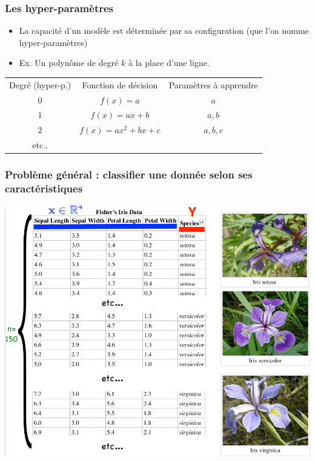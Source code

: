 \documentclass[french]{beamer}
\begin{document}
\begin{frame}
\frametitle{Les hyper-paramètres}

\begin{itemize}
\item La capacité d'un modèle est déterminée par sa configuration (que l'on nomme hyper-paramètres)

\item Ex. Un polynôme de degré $k$ à la place d'une ligne.
\end{itemize}

\begin{tabular}{ccc}
Degré (hyper-p.) & Fonction de décision & Paramètres à apprendre \\
$0$	& $f(x) = a$ & $a$ \\
$1$ & $f(x) = ax+b$ & $a,b$ \\
$2$ & $f(x) = ax^2 + bx + c$ & $a,b,c$ \\
etc..& &
\end{tabular}

\end{frame}



\begin{frame}[fragile]
\frametitle{Problème général : classifier une donnée selon ses
caractéristiques}

\begin{center}
\includegraphics[scale=0.25]{10.png}
\end{center}

\end{frame}
\end{document}
